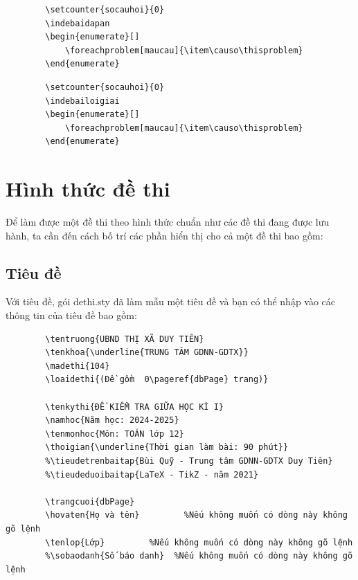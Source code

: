 	\setcounter{socauhoi}{0}
	\indapanloigiai
	\begin{enumerate}[]
		\foreachproblem[maucau]{\item\causo\thisproblem}
	\end{enumerate}
	
	\begin{verbatim}
		\setcounter{socauhoi}{0}
		\indebaidapan
		\begin{enumerate}[]
			\foreachproblem[maucau]{\item\causo\thisproblem}
		\end{enumerate}
	\end{verbatim}
	\setcounter{socauhoi}{0}
	\indebaidapan
	\begin{enumerate}[]
		\foreachproblem[maucau]{\item\causo\thisproblem}
	\end{enumerate}
	
	\begin{verbatim}
		\setcounter{socauhoi}{0}
		\indebailoigiai
		\begin{enumerate}[]
			\foreachproblem[maucau]{\item\causo\thisproblem}
		\end{enumerate}
	\end{verbatim}
	\setcounter{socauhoi}{0}
	\indebailoigiai
	\begin{enumerate}[]
		\foreachproblem[maucau]{\item\causo\thisproblem}
	\end{enumerate}
	
	\section{Hình thức đề thi}
	Để làm được một đề thi theo hình thức chuẩn như các đề thi đang được lưu hành, ta cần đến cách bố trí các phần hiển thị cho cả một đề thi bao gồm:
	\subsection{Tiêu đề}
	Với tiêu đề, gói dethi.sty đã làm mẫu một tiêu đề và bạn có thể nhập vào các thông tin của tiêu đề bao gồm:
	\begin{verbatim}
		\tentruong{UBND THỊ XÃ DUY TIÊN}
		\tenkhoa{\underline{TRUNG TÂM GDNN-GDTX}}
		\madethi{104} 
		\loaidethi{(Đề gồm  0\pageref{dbPage} trang)}
		
		\tenkythi{ĐỀ KIỂM TRA GIỮA HỌC KÌ I}
		\namhoc{Năm học: 2024-2025}
		\tenmonhoc{Môn: TOÁN lớp 12}
		\thoigian{\underline{Thời gian làm bài: 90 phút}}   
		%\tieudetrenbaitap{Bùi Quỹ - Trung tâm GDNN-GDTX Duy Tiên}
		%\tieudeduoibaitap{LaTeX - TikZ - năm 2021}
		
		\trangcuoi{dbPage}
		\hovaten{Họ và tên}         %Nếu không muốn có dòng này không gõ lệnh
		\tenlop{Lớp}         %Nếu không muốn có dòng này không gõ lệnh
		%\sobaodanh{Số báo danh}  %Nếu không muốn có dòng này không gõ lệnh
	\end{verbatim}
	
